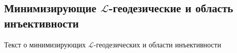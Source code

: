 \subsection{\texorpdfstring{Минимизирующие $\mathcal{L}$-геодезические и область инъективности}{Минимизирующие L-геодезические и область инъективности}}
Текст о минимизирующих $\mathcal{L}$-геодезических и области инъективности

